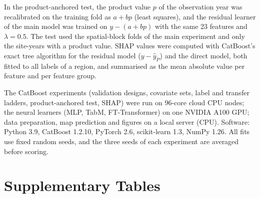 \documentclass[pdflatex,sn-nature]{sn-jnl}
\begin{document}
In the product-anchored test, the product value $p$ of the observation year was recalibrated on the training fold as $a+bp$ (least squares), and the residual learner of the main model was trained on $y-(a+bp)$ with the same 23 features and $\lambda=0.5$. The test used the spatial-block folds of the main experiment and only the site-years with a product value. SHAP values\cite{Lundberg2017} were computed with CatBoost's exact tree algorithm for the residual model ($y-\hat{y}_P$) and the direct model, both fitted to all labels of a region, and summarised as the mean absolute value per feature and per feature group.

The CatBoost experiments (validation designs, covariate sets, label and transfer ladders, product-anchored test, SHAP) were run on 96-core cloud CPU nodes; the neural learners (MLP, TabM, FT-Transformer) on one NVIDIA A100 GPU; data preparation, map prediction and figures on a local server (CPU). Software: Python 3.9, CatBoost 1.2.10, PyTorch 2.6, scikit-learn 1.3, NumPy 1.26. All fits use fixed random seeds, and the three seeds of each experiment are averaged before scoring.

\section{Supplementary Tables}
\end{document}

